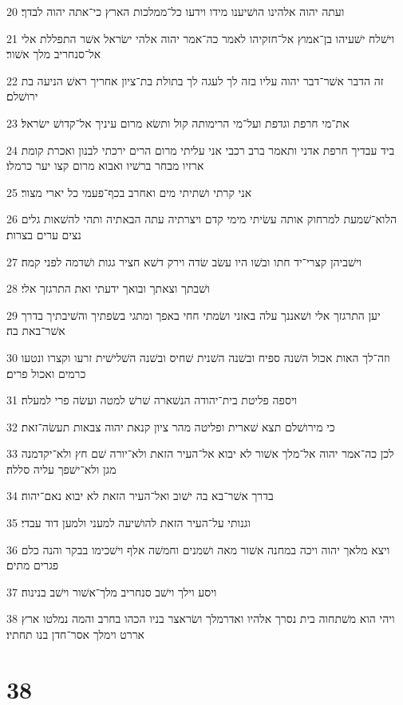 \par 20 ועתה יהוה אלהינו הושׁיענו מידו וידעו כל־ממלכות הארץ כי־אתה יהוה לבדך׃
\par 21 וישׁלח ישׁעיהו בן־אמוץ אל־חזקיהו לאמר כה־אמר יהוה אלהי ישׂראל אשׁר התפללת אלי אל־סנחריב מלך אשׁור׃
\par 22 זה הדבר אשׁר־דבר יהוה עליו בזה לך לעגה לך בתולת בת־ציון אחריך ראשׁ הניעה בת ירושׁלם׃
\par 23 את־מי חרפת וגדפת ועל־מי הרימותה קול ותשׂא מרום עיניך אל־קדושׁ ישׂראל׃
\par 24 ביד עבדיך חרפת אדני ותאמר ברב רכבי אני עליתי מרום הרים ירכתי לבנון ואכרת קומת ארזיו מבחר ברשׁיו ואבוא מרום קצו יער כרמלו׃
\par 25 אני קרתי ושׁתיתי מים ואחרב בכף־פעמי כל יארי מצור׃
\par 26 הלוא־שׁמעת למרחוק אותה עשׂיתי מימי קדם ויצרתיה עתה הבאתיה ותהי להשׁאות גלים נצים ערים בצרות׃
\par 27 וישׁביהן קצרי־יד חתו ובשׁו היו עשׂב שׂדה וירק דשׁא חציר גגות ושׁדמה לפני קמה׃
\par 28 ושׁבתך וצאתך ובואך ידעתי ואת התרגזך אלי׃
\par 29 יען התרגזך אלי ושׁאננך עלה באזני ושׂמתי חחי באפך ומתגי בשׂפתיך והשׁיבתיך בדרך אשׁר־באת בה׃
\par 30 וזה־לך האות אכול השׁנה ספיח ובשׁנה השׁנית שׁחיס ובשׁנה השׁלישׁית זרעו וקצרו ונטעו כרמים ואכול פרים׃
\par 31 ויספה פליטת בית־יהודה הנשׁארה שׁרשׁ למטה ועשׂה פרי למעלה׃
\par 32 כי מירושׁלם תצא שׁארית ופליטה מהר ציון קנאת יהוה צבאות תעשׂה־זאת׃
\par 33 לכן כה־אמר יהוה אל־מלך אשׁור לא יבוא אל־העיר הזאת ולא־יורה שׁם חץ ולא־יקדמנה מגן ולא־ישׁפך עליה סללה׃
\par 34 בדרך אשׁר־בא בה ישׁוב ואל־העיר הזאת לא יבוא נאם־יהוה׃
\par 35 וגנותי על־העיר הזאת להושׁיעה למעני ולמען דוד עבדי׃
\par 36 ויצא מלאך יהוה ויכה במחנה אשׁור מאה ושׁמנים וחמשׁה אלף וישׁכימו בבקר והנה כלם פגרים מתים׃
\par 37 ויסע וילך וישׁב סנחריב מלך־אשׁור וישׁב בנינוה׃
\par 38 ויהי הוא משׁתחוה בית נסרך אלהיו ואדרמלך ושׂראצר בניו הכהו בחרב והמה נמלטו ארץ אררט וימלך אסר־חדן בנו תחתיו׃

\chapter{38}

